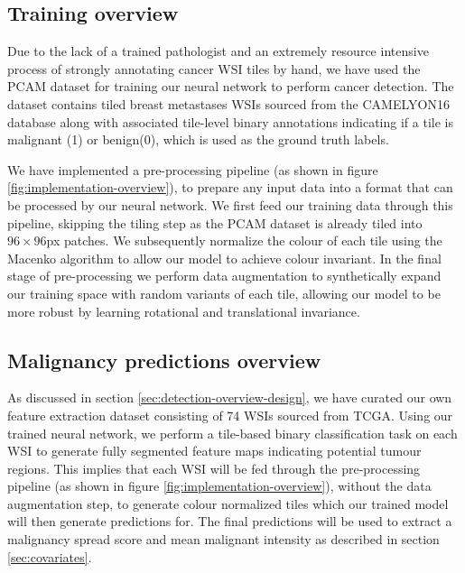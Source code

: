 \documentclass{l4proj}
\begin{document}
\subsection{Training overview}
Due to the lack of a trained pathologist and an extremely resource intensive process of strongly annotating cancer WSI tiles by hand, we have used the PCAM dataset for training our neural network to perform cancer detection. The dataset contains tiled breast metastases WSIs sourced from the CAMELYON16 database along with associated tile-level binary annotations indicating if a tile is malignant (1) or benign(0), which is used as the ground truth labels.

We have implemented a pre-processing pipeline (as shown in figure \ref{fig:implementation-overview}),  to prepare any input data into a format that can be processed by our neural network. We first feed our training data through this pipeline, skipping the tiling step as the PCAM dataset is already tiled into \(96 \times 96\)px patches. We subsequently normalize the colour of each tile using the Macenko algorithm to allow our model to achieve colour invariant. In the final stage of pre-processing we perform data augmentation to synthetically expand our training space with random variants of each tile, allowing our model to be more robust by learning rotational and translational invariance.

\subsection{Malignancy predictions overview}
As discussed in section \ref{sec:detection-overview-design}, we have curated our own feature extraction dataset consisting of 74 WSIs sourced from TCGA. Using our trained neural network, we perform a tile-based binary classification task on each WSI to generate fully segmented feature maps indicating potential tumour regions. This implies that each WSI will be fed through the pre-processing pipeline (as shown in figure \ref{fig:implementation-overview}), without the data augmentation step, to generate colour normalized tiles which our trained model will then generate predictions for. The final predictions will be used to extract a malignancy spread score and mean malignant intensity as described in section \ref{sec:covariates}.
\end{document}
